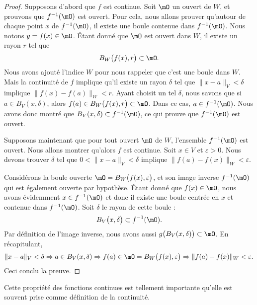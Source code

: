 \begin{proof}
	Supposons d'abord que $f$ est continue. Soit $\mO$ un ouvert de $W$, et prouvons que $f^{-1}(\mO)$ est ouvert. Pour cela, nous allons prouver qu'autour de chaque point $x$ de $f^{-1}(\mO)$, il existe une boule contenue dans $f^{-1}(\mO)$. Nous notons $y=f(x)\in\mO$. Étant donné que $\mO$ est ouvert dans $W$, il existe un rayon $r$ tel que
	\begin{equation}
		B_W\big( f(x),r \big)\subset\mO.
	\end{equation}
	Nous avons ajouté l'indice $W$ pour nous rappeler que c'est une boule dans $W$. Mais la continuité de $f$ implique qu'il existe un rayon $\delta$ tel que $\| x-a \|_V<\delta$ implique $\big\| f(x)-f(a) \big\|_W<r$. Ayant choisit un tel $\delta$, nous savons que si $a\in B_V(x,\delta)$, alors $f(a)\in B_W\big( f(x),r \big)\subset \mO$. Dans ce cas, $a\in f^{-1}(\mO)$. Nous avons donc montré que $B_V(x,\delta)\subset f^{-1}(\mO)$, ce qui prouve que $f^{-1}(\mO)$ est ouvert.

	Supposons maintenant que pour tout ouvert $\mO$ de $W$, l'ensemble $f^{-1}(\mO)$ est ouvert. Nous allons montrer qu'alors $f$ est continue. Soit $x\in V$ et $\varepsilon>0$. Nous devons trouver $\delta$ tel que $0<\| x-a \|_V<\delta$ implique $\| f(a)-f(x) \|_W<\varepsilon$.

	Considérons la boule ouverte $\mO=B_W\big( f(x),\varepsilon \big)$, et son image inverse $f^{-1}(\mO)$ qui est également ouverte par hypothèse. Étant donné que $f(x)\in\mO$, nous avons évidemment $x\in f^{-1}(\mO)$ et donc il existe une boule centrée en $x$ et contenue dans $f^{-1}(\mO)$. Soit $\delta$ le rayon de cette boule :
	\begin{equation}
		B_V\big( x,\delta \big)\subset f^{-1}(\mO).
	\end{equation}
	Par définition de l'image inverse, nous avons aussi $g\big( B_V(x,\delta) \big)\subset\mO$. En récapitulant,
	\begin{equation}
		\| x-a \|_V<\delta\Rightarrow a\in B_V(x,\delta)\Rightarrow f(a)\in\mO=B_W\big( f(x),\varepsilon \big)\Rightarrow\| f(a)-f(x) \|_W<\varepsilon.
	\end{equation}
	Ceci conclu la preuve.
\end{proof}

\begin{remark}
	Cette propriété des fonctions continues est tellement importante qu'elle est souvent prise comme définition de la continuité.
\end{remark}

